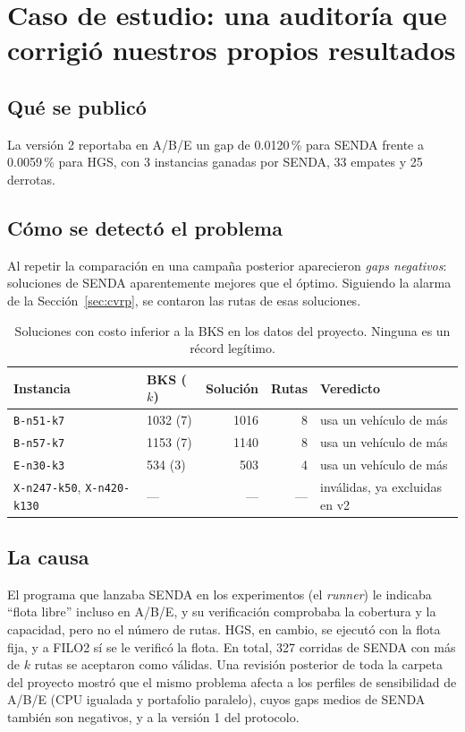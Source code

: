 \documentclass[11pt,a4paper]{article}
\newcommand{\tsl}[1]{\texttt{\small #1}}
\begin{document}
\section{Caso de estudio: una auditoría que corrigió nuestros propios resultados}
\label{sec:caso}

\subsection{Qué se publicó}
La versión 2 reportaba en A/B/E un gap de 0.0120\,\% para SENDA frente a 0.0059\,\% para HGS, con 3
instancias ganadas por SENDA, 33 empates y 25 derrotas.

\subsection{Cómo se detectó el problema}
Al repetir la comparación en una campaña posterior aparecieron
\emph{gaps negativos}: soluciones de SENDA aparentemente mejores que el óptimo. Siguiendo la alarma de
la Sección~\ref{sec:cvrp}, se contaron las rutas de esas soluciones.

\begin{table}[H]
\centering
\caption{Soluciones con costo inferior a la BKS en los datos del proyecto. Ninguna es un récord
legítimo.}
\label{tab:bks}
\small
\begin{tabular}{@{}llrrl@{}}
\toprule
Instancia & BKS ($k$) & Solución & Rutas & Veredicto \\
\midrule
\tsl{B-n51-k7} & 1032 (7) & 1016 & 8 & usa un vehículo de más \\
\tsl{B-n57-k7} & 1153 (7) & 1140 & 8 & usa un vehículo de más \\
\tsl{E-n30-k3} & 534 (3) & 503 & 4 & usa un vehículo de más \\
\tsl{X-n247-k50}, \tsl{X-n420-k130} & --- & --- & --- & inválidas, ya excluidas en v2 \\
\bottomrule
\end{tabular}
\end{table}

\subsection{La causa}
El programa que lanzaba SENDA en los experimentos (el \emph{runner}) le indicaba ``flota libre'' incluso
en A/B/E, y su verificación comprobaba la cobertura y la capacidad, pero no el número de rutas. HGS,
en cambio, se ejecutó con la flota fija, y a FILO2 sí se le verificó la flota. En total, 327 corridas
de SENDA con más de $k$ rutas se aceptaron como válidas. Una revisión posterior de toda la carpeta del
proyecto mostró que el mismo problema afecta a los perfiles de sensibilidad de A/B/E (CPU igualada y
portafolio paralelo), cuyos gaps medios de SENDA también son negativos, y a la versión 1 del protocolo.
\end{document}
